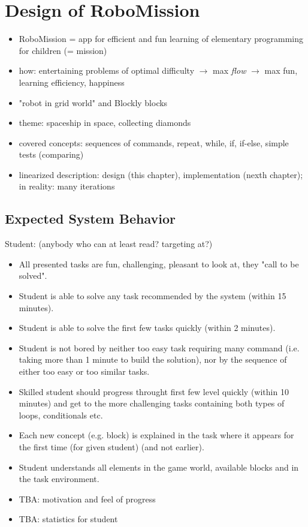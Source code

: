 \chapter{Design of RoboMission}
\label{chap:design-of-robomission}

\begin{itemize}
\item RoboMission = app for efficient and fun learning of elementary programming for children (= mission)
\item how: entertaining problems of optimal difficulty $\rightarrow$ max \emph{flow} $\rightarrow$ max fun, learning efficiency, happiness
\item "robot in grid world" and Blockly blocks
\item theme: spaceship in space, collecting diamonds
\item covered concepts: sequences of commands, repeat, while, if, if-else, simple tests (comparing)
\item linearized description: design (this chapter), implementation (nexth chapter); in reality: many iterations
\end{itemize}




\section{Expected System Behavior}
\label{sec:robomission.behavior}

Student: (anybody who can at least read? targeting at?)
\begin{itemize}
\item All presented tasks are fun, challenging, pleasant to look at, they "call to be solved".
\item Student is able to solve any task recommended by the system (within 15 minutes).
\item Student is able to solve the first few tasks quickly (within 2 minutes).
\item Student is not bored by neither too easy task requiring many command (i.e. taking more than 1 minute to build the solution), nor by the sequence of either too easy or too similar tasks.
\item Skilled student should progress throught first few level quickly (within 10 minutes) and get to the more challenging tasks containing both types of loops, conditionals etc.
\item Each new concept (e.g. block) is explained in the task where it appears for the first time (for given student) (and not earlier).
\item Student understands all elements in the game world, available blocks and in the task environment.
\item TBA: motivation and feel of progress
\item TBA: statistics for student
\end{itemize}

